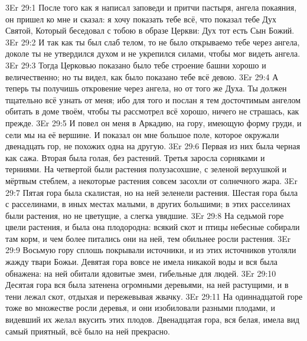 \vs 3Er 29:1
После того как я написал заповеди и притчи пастыря, ангела
покаяния, он пришел ко мне и сказал: я хочу показать тебе всё, что показал
тебе Дух Святой, Который беседовал с тобою в образе Церкви: Дух тот есть Сын
Божий.
\vs 3Er 29:2
И так как ты был слаб телом, то не было открываемо тебе через ангела, доколе
ты не утвердился духом и не укрепился силами, чтобы мог видеть ангела.
\vs 3Er 29:3
Тогда Церковью показано было тебе строение башни хорошо и величественно; но ты
видел, как было показано тебе всё девою.
\vs 3Er 29:4
А теперь ты получишь откровение через ангела, но от того же Духа. Ты должен
тщательно всё узнать от меня; ибо для того и послан я тем досточтимым ангелом
обитать в доме твоём, чтобы ты рассмотрел всё хорошо, ничего не страшась, как
прежде.
\vs 3Er 29:5
И повел он меня в Аркадию,
на гору, имеющую форму груди, и сели мы на её вершине. И показал он мне
большое поле, которое окружали двенадцать гор, не похожих одна на другую.
\vs 3Er 29:6
Первая из них была черная
как сажа. Вторая была голая, без растений. Третья заросла сорняками и
терниями. На четвертой были растения полузасохшие, с зеленой верхушкой и
мёртвым стеблем, а некоторые растения совсем засохли от солнечного жара.
\vs 3Er 29:7
Пятая гора была скалистая,
но на ней зеленели растения. Шестая гора была с расселинами, в иных местах
малыми, в других большими; в этих расселинах были растения, но не цветущие, а
слегка увядшие.
\vs 3Er 29:8
На седьмой горе цвели
растения, и была она плодородна: всякий скот и птицы небесные собирали там
корм, и чем более питались они на ней, тем обильнее росли растения.
\vs 3Er 29:9
Восьмую гору сплошь
покрывали источники, и из этих источников утоляли жажду твари Божьи. Девятая
гора вовсе не имела никакой воды и вся была обнажена: на ней обитали ядовитые
змеи, гибельные для людей.
\vs 3Er 29:10
Десятая гора вся была
затенена огромными деревьями, на ней растущими, и в тени лежал скот, отдыхая и
пережевывая жвачку.
\vs 3Er 29:11
На одиннадцатой горе тоже
во множестве росли деревья, и они изобиловали разными плодами, и видевший их
желал вкусить этих плодов. Двенадцатая гора, вся белая, имела вид самый
приятный, всё было на ней прекрасно.

